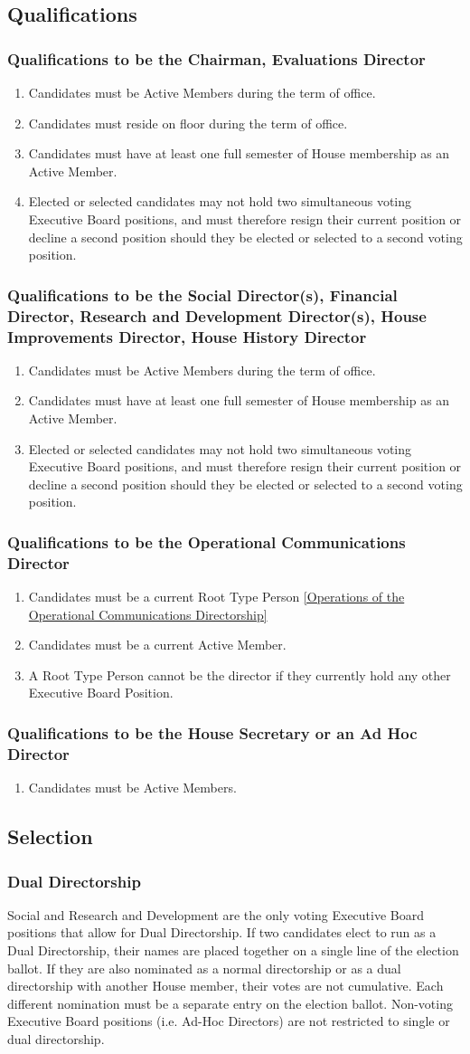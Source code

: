 \documentclass{article}
\newcommand{\asection}[1]{\subsection{#1} \label{#1}}
\newcommand{\asubsection}[1]{\subsubsection{#1} \label{#1}}
\begin{document}
\asection{Qualifications}
\asubsection{Qualifications to be the Chairman, Evaluations Director}
\begin{enumerate}
	\item Candidates must be Active Members during the term of office.
	\item Candidates must reside on floor during the term of office.
	\item Candidates must have at least one full semester of House membership as an Active Member.
	\item Elected or selected candidates may not hold two simultaneous voting Executive Board positions, and must therefore resign their current position or decline a second position should they be elected or selected to a second voting position.
\end{enumerate}
\asubsection{Qualifications to be the Social Director(s), Financial Director, Research and Development Director(s), House Improvements Director, House History Director}
\begin{enumerate}
	\item Candidates must be Active Members during the term of office.
	\item Candidates must have at least one full semester of House membership as an Active Member.
	\item Elected or selected candidates may not hold two simultaneous voting Executive Board positions, and must therefore resign their current position or decline a second position should they be elected or selected to a second voting position.
\end{enumerate}
\asubsection{Qualifications to be the Operational Communications Director}
\begin{enumerate}
	\item Candidates must be a current Root Type Person \ref{Operations of the Operational Communications Directorship}
	\item Candidates must be a current Active Member.
	\item A Root Type Person cannot be the director if they currently hold any other Executive Board Position.
\end{enumerate}

\asubsection{Qualifications to be the House Secretary or an Ad Hoc Director}
\begin{enumerate}
\item
 Candidates must be Active Members.
\end{enumerate}

\asection{Selection}
\asubsection{Dual Directorship}
Social and Research and Development are the only voting Executive Board positions that allow for Dual Directorship.
If two candidates elect to run as a Dual Directorship, their names are placed together on a single line of the election ballot.
If they are also nominated as a normal directorship or as a dual directorship with another House member, their votes are not cumulative.
Each different nomination must be a separate entry on the election ballot. 
Non-voting Executive Board positions (i.e. Ad-Hoc Directors) are not restricted to single or dual directorship.
\end{document}
